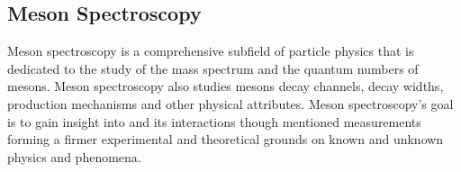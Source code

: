\subsection{Meson Spectroscopy}\label{sec:intro.spect}
Meson spectroscopy is a comprehensive subfield of particle physics that is dedicated to the study of the mass spectrum and the quantum numbers of mesons. Meson spectroscopy also studies mesons decay channels, decay widths, production mechanisms and other physical attributes. Meson spectroscopy's goal is to gain insight into  and its interactions though mentioned measurements forming a firmer experimental and theoretical grounds on known and unknown physics and phenomena.
